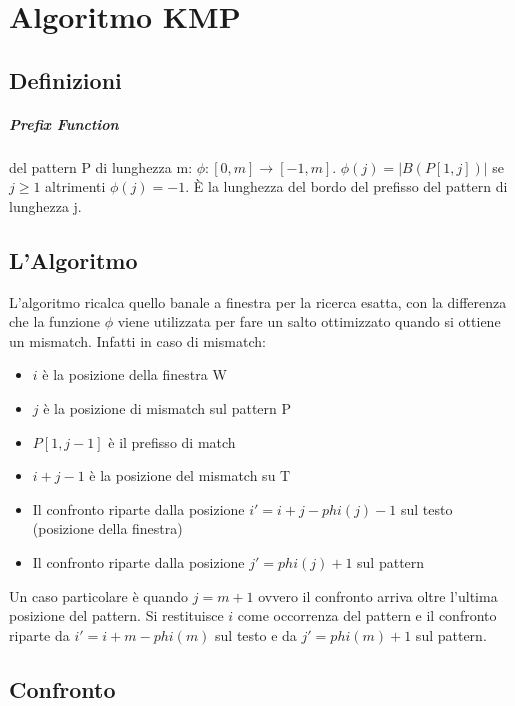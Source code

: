 \chapter{Algoritmo KMP}

\section{Definizioni}

\paragraph{Prefix Function} del pattern P di lunghezza m: $\phi : [0,m] \rightarrow [-1,m]$. $\phi(j) = |B(P[1,j])|$ se $j \geq 1$ altrimenti $\phi(j) = -1$. \`E la lunghezza del bordo del prefisso del pattern di lunghezza j.

\section{L'Algoritmo}

L'algoritmo ricalca quello banale a finestra per la ricerca esatta, con la differenza che la funzione $\phi$ viene utilizzata per fare un salto ottimizzato quando si ottiene un mismatch. Infatti in caso di mismatch:

\begin{itemize}
    \item $i$ \`e la posizione della finestra W
    \item $j$ \`e la posizione di mismatch sul pattern P
    \item $P[1,j-1]$ \`e il prefisso di match
    \item $i+j-1$ \`e la posizione del mismatch su T
    \item Il confronto riparte dalla posizione $i' = i + j - phi(j) - 1$ sul testo (posizione della finestra)
    \item Il confronto riparte dalla posizione $j' = phi(j) + 1$ sul pattern
\end{itemize}

Un caso particolare \`e quando $j = m+1$ ovvero il confronto arriva oltre l'ultima posizione del pattern. Si restituisce $i$ come occorrenza del pattern e il confronto riparte da $i' = i + m - phi(m)$ sul testo e da $j' = phi(m) + 1$ sul pattern.

\section{Confronto}

